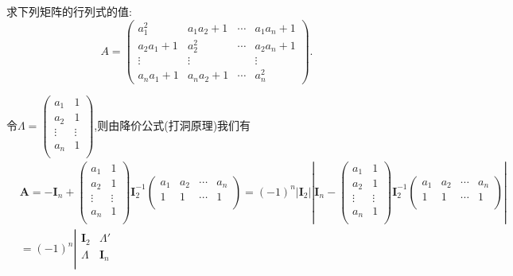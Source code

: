 \documentclass[../../main.tex]{subfiles}%
\begin{document}
\begin{example}\label{example:1895}
求下列矩阵的行列式的值:
\[
A = 
\begin{pmatrix}
a_1^2 & a_1a_2 + 1 & \cdots & a_1a_n + 1\\
a_2a_1 + 1 & a_2^2 & \cdots & a_2a_n + 1\\
\vdots & \vdots & & \vdots\\
a_na_1 + 1 & a_na_2 + 1 & \cdots & a_n^2
\end{pmatrix}.
\]
\end{example}
\begin{solution}
令$\boldsymbol{\varLambda }=\left( \begin{matrix}
a_1&		1\\
a_2&		1\\
\vdots&		\vdots\\
a_n&		1\\
\end{matrix} \right)$,则由降价公式(打洞原理)我们有
\begin{align*}
&\boldsymbol{A}=-\boldsymbol{I}_n+\left( \begin{matrix}
a_1&		1\\
a_2&		1\\
\vdots&		\vdots\\
a_n&		1\\
\end{matrix} \right) \boldsymbol{I}_{2}^{-1}\left( \begin{matrix}
a_1&		a_2&		\cdots&		a_n\\
1&		1&		\cdots&		1\\
\end{matrix} \right) =\left( -1 \right) ^n\left| \boldsymbol{I}_2 \right|\left| \boldsymbol{I}_n-\left( \begin{matrix}
a_1&		1\\
a_2&		1\\
\vdots&		\vdots\\
a_n&		1\\
\end{matrix} \right) \boldsymbol{I}_{2}^{-1}\left( \begin{matrix}
a_1&		a_2&		\cdots&		a_n\\
1&		1&		\cdots&		1\\
\end{matrix} \right) \right|
\\
&=\left( -1 \right) ^n\left| \begin{matrix}
\boldsymbol{I}_2&		\boldsymbol{\varLambda }'\\
\boldsymbol{\varLambda }&		\boldsymbol{I}_n\\

\end{matrix}
\end{align*}
\end{solution}
\end{document}
